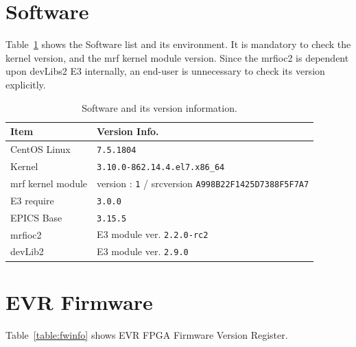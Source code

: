 \documentclass[11pt
  , a4paper
  , article
  , oneside
  , showtrims
]{memoir}
\begin{document}
\section{Software}
Table~\ref{table:swlist} shows the Software list and its environment. It is mandatory to check the kernel version, and the mrf kernel module version. Since the mrfioc2 is dependent upon devLibs2 E3 internally, an end-user is unnecessary to check its version explicitly.
\begin{table}[!htb]
  \centering
  \begin{tabular}{l|l}
    \toprule
    Item               & Version Info.                                                      \\\midrule
    CentOS Linux       & \texttt{7.5.1804}                                                  \\\midrule
    Kernel             & \texttt{3.10.0-862.14.4.el7.x86\_64}                               \\\midrule
    mrf kernel module  & version : \texttt{1} / srcversion \texttt{A998B22F1425D7388F5F7A7} \\\midrule
    E3 require         & \texttt{3.0.0}                                                     \\\midrule
    EPICS Base         & \texttt{3.15.5}                                                    \\\midrule
    mrfioc2            & E3 module ver. \texttt{2.2.0-rc2}                                  \\\midrule
    devLib2            & E3 module ver. \texttt{2.9.0}                                      \\\bottomrule
  \end{tabular}
  \caption[]{Software and its version information.}
  \label{table:swlist}
\end{table}

\section{EVR Firmware}
Table~\ref{table:fwinfo} shows EVR FPGA Firmware Version Register.
\end{document}
